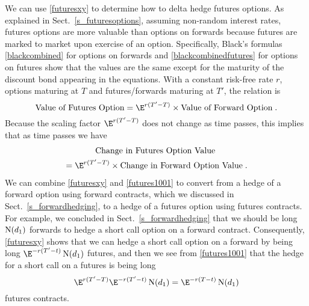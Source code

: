 We can use \eqref{futuresxy} to determine how to delta hedge  futures options.  As explained in Sect.~\ref{s_futuresoptions}, assuming non-random interest rates, futures options are more valuable than options on forwards because futures are marked to market upon exercise of an option. Specifically, Black's formulas \eqref{blackcombined} for options on forwards and \eqref{blackcombinedfutures} for options on futures show that the values are the same except for the maturity of the discount bond appearing in the equations.  With a constant risk-free rate $r$, options maturing at $T$ and futures/forwards maturing at $T'$, the relation is
$$\text{Value of Futures Option} = \E^{r(T'-T)} \times \text{Value of Forward Option}\; .$$
Because the scaling factor $\E^{r(T'-T)}$ does not change as time passes, this implies that as time passes we have
\begin{multline}\label{futures1001}
\text{Change in Futures Option Value } \\= \E^{r(T'-T)} \times \text{Change in Forward Option Value}\;.
\end{multline}
We can combine  \eqref{futuresxy} and \eqref{futures1001} to convert from a hedge of a forward option using forward contracts, which we discussed in Sect.~\ref{s_forwardhedging}, to a hedge of a futures option using futures contracts.  For example, we concluded in Sect.~\ref{s_forwardhedging} that we should be long $\operatorname{N}(d_1)$ forwards to hedge a short call option on a forward contract.  Consequently,  \eqref{futuresxy} shows that we can hedge a short call option on a forward by being long $\E^{-r(T'-t)}\N(d_1)$ futures, and then we see from \eqref{futures1001}  that the hedge for a short call on a futures is being long
$$\E^{r(T'-T)}\E^{-r(T'-t)}\N(d_1) = \E^{-r(T-t)}\N(d_1)$$ 
futures contracts.

